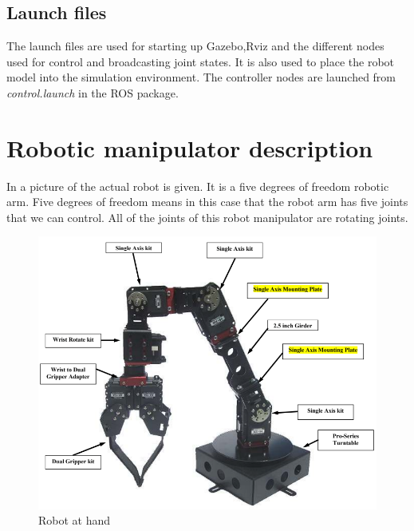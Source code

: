 \subsection{Launch files}
The launch files are used for starting up Gazebo,Rviz and the different nodes used for control and broadcasting joint states. It is also used to place the robot model into the simulation environment. The controller nodes are launched from \textit{control.launch} in the ROS package. 



























\section{Robotic manipulator description}
In  a picture of the actual robot is given. It is a five degrees of freedom robotic arm. Five degrees of freedom means in this case that the robot arm has five joints that we can control. All of the joints of this robot manipulator are rotating joints\cite{Crustcrawler}. 

\begin{figure}[htbp]
  \centering
  \includegraphics[width=.7\textwidth]{img/robotAH.png}
  \caption{Robot at hand}
  \label{fig:robotAH}
\end{figure}



